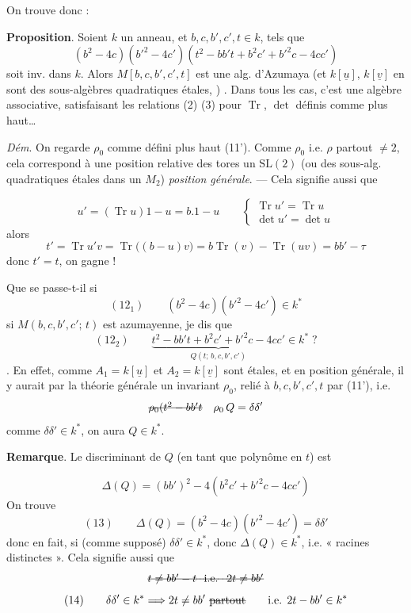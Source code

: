 \documentclass[11pt,a4paper]{article}
\begin{document}
On trouve donc :

\textbf{Proposition}. Soient $k$ un anneau, et $b, c, b', c', t \in k$, tels que
\[
(b^2 - 4c)(b'^2 - 4c')(t^2 - bb't + b^2c' + b'^2c - 4cc')
\]
soit inv. dans $k$. Alors $M[b, c, b', c', t]$ est une alg. d'Azumaya \add{\ill{}} (et $k[\underline{u}]$, $k[\underline{v}]$ en sont des sous-algèbres quadratiques étales, ) \struck{\ill{}}. Dans tous les cas, c'est une algèbre associative,  satisfaisant les relations (2) (3) pour $\operatorname{Tr}$, $\det$ définis comme plus haut\ldots

\emph{Dém}. On regarde $\rho_0$ comme défini plus haut (11'). Comme $\rho_0$ \struck{\ill{}} i.e. $\rho$ partout $\neq 2$, cela correspond à une position relative des tores \ill{} un $\mathrm{SL}(2)$ (ou des sous-alg. quadratiques étales  dans un $M_2$)  \emph{position générale}. --- Cela signifie aussi que

\[
u' = (\operatorname{Tr} u)1 - u = b.1 - u
\qquad
\begin{cases} \operatorname{Tr} u' = \operatorname{Tr} u \\ \det u' = \det u \end{cases}
\]
alors
\[
t' = \operatorname{Tr} u'v = \operatorname{Tr}\bigl((b - u)v\bigr) = b\operatorname{Tr}(v) - \operatorname{Tr}(uv) = bb' - \tau
\]
donc \struck{\ill{}} $t' = t$, on gagne !

Que se passe-t-il si
\[
(12_1)\qquad (b^2 - 4c)(b'^2 - 4c') \in k^*
\]
  si $M(b, c, b', c';\, t)$ est azumayenne, je dis que
\[
(12_2)\qquad \underbrace{t^2 - bb't + b^2c' + b'^2c - 4cc'}_{Q(t;\, b, c, b', c')} \in k^* \;?
\]
 . En effet, 
comme $A_1 = k[\underline{u}]$ et $A_2 = k[\underline{v}]$ \struck{\ill{}} sont étales, et en position générale, il y aurait par la théorie  générale un invariant $\rho_0$, relié à $b, c, b', c', t$ par (11'), i.e.
\[
\text{\struck{$\rho_0(t^2 - bb't$}} \quad \rho_0\, Q = \delta\delta'
\]
comme $\delta\delta' \in k^*$, on aura $Q \in k^*$.

\textbf{Remarque}. Le discriminant de $Q$ (en tant que polynôme en $t$) est

\[
\Delta(Q) = (bb')^2 - 4(b^2c' + b'^2c - 4cc')
\]
On trouve
\[
(13)\qquad \Delta(Q) = (b^2 - 4c)(b'^2 - 4c') = \delta\delta'
\]
donc en fait, si \struck{\ill{}} (comme  supposé) $\delta\delta' \in k^*$, donc $\Delta(Q) \in k^*$, i.e. « racines distinctes ». Cela signifie aussi que
\[
\text{\struck{$t \neq bb' - t$ \ i.e. \ $2t \neq bb'$}}
\]
\[
(14)\qquad \delta\delta' \in k^* \Longrightarrow 2t \neq bb' \ \text{\struck{partout}} \qquad \text{i.e. } 2t - bb' \in k^*
\]
\end{document}

